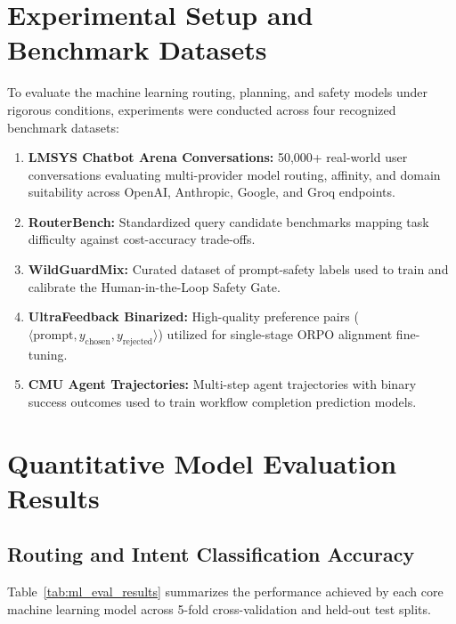 \documentclass[12pt,a4paper]{report}
\begin{document}
\section{Experimental Setup and Benchmark Datasets}
To evaluate the machine learning routing, planning, and safety models under rigorous conditions, experiments were conducted across four recognized benchmark datasets:
\begin{enumerate}
    \item \textbf{LMSYS Chatbot Arena Conversations:} 50,000+ real-world user conversations evaluating multi-provider model routing, affinity, and domain suitability across OpenAI, Anthropic, Google, and Groq endpoints.
    \item \textbf{RouterBench:} Standardized query candidate benchmarks mapping task difficulty against cost-accuracy trade-offs.
    \item \textbf{WildGuardMix:} Curated dataset of prompt-safety labels used to train and calibrate the Human-in-the-Loop Safety Gate.
    \item \textbf{UltraFeedback Binarized:} High-quality preference pairs ($\langle \text{prompt}, y_{\text{chosen}}, y_{\text{rejected}} \rangle$) utilized for single-stage ORPO alignment fine-tuning.
    \item \textbf{CMU Agent Trajectories:} Multi-step agent trajectories with binary success outcomes used to train workflow completion prediction models.
\end{enumerate}

\section{Quantitative Model Evaluation Results}

\subsection{Routing and Intent Classification Accuracy}
Table~\ref{tab:ml_eval_results} summarizes the performance achieved by each core machine learning model across 5-fold cross-validation and held-out test splits.
\end{document}

